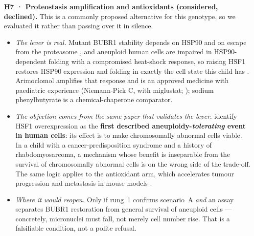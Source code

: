 \documentclass[10pt]{article}
\begin{document}
\textbf{H7 · Proteostasis amplification and antioxidants (considered, declined).}
\label{sec:h7}
This is a commonly proposed alternative for this genotype, so we evaluated it rather than passing over it in
silence.
\begin{itemize}
\item \textit{The lever is real.} Mutant BUBR1 stability depends on HSP90 and on escape from the proteasome
  \citep{suij}, and aneuploid human cells are impaired in HSP90-dependent folding with a compromised heat-shock
  response, so raising HSF1 restores HSP90 expression and folding in exactly the cell state this child has
  \citep{donnelly}. Arimoclomol amplifies that response and is an approved medicine with paediatric experience
  (Niemann-Pick C, with miglustat; \citealp{mengel}); sodium phenylbutyrate is a chemical-chaperone comparator.
\item \textit{The objection comes from the same paper that validates the lever.} \citet{donnelly} identify HSF1
  overexpression as the \textbf{first described aneuploidy-\emph{tolerating} event in human cells}: its effect is
  to make chromosomally abnormal cells viable. In a child with a cancer-predisposition syndrome and a history of
  rhabdomyosarcoma, a mechanism whose benefit is inseparable from the survival of chromosomally abnormal cells is
  on the wrong side of the trade-off. The same logic applies to the antioxidant arm, which accelerates tumour
  progression and metastasis in mouse models \citep{sayin,wiel}.
\item \textit{Where it would reopen.} Only if rung~1 confirms scenario~A \emph{and} an assay separates BUBR1
  restoration from general survival of aneuploid cells --- concretely, micronuclei must fall, not merely cell
  number rise. That is a falsifiable condition, not a polite refusal.
\end{itemize}
\end{document}
